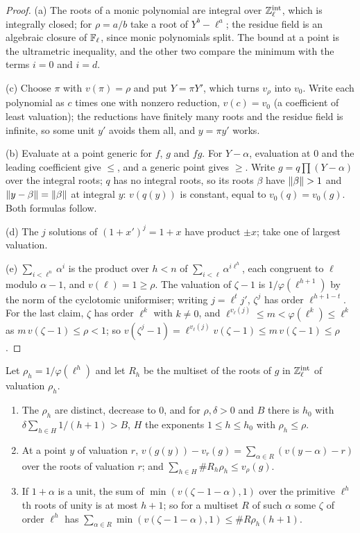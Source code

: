 \begin{proof}
(a) The roots of a monic polynomial are integral over $\mathbb{Z}_\ell^{\rm int}$, which is integrally closed; for $\rho=a/b$ take a root of $Y^b-\ell^a$; the residue field is an algebraic closure of $\mathbb{F}_\ell$, since monic polynomials split. The bound at a point is the ultrametric inequality, and the other two compare the minimum with the terms $i=0$ and $i=d$.

(c) Choose $\pi$ with $v(\pi)=\rho$ and put $Y=\pi Y'$, which turns $v_\rho$ into $v_0$. Write each polynomial as $c$ times one with nonzero reduction, $v(c)=v_0$ (a coefficient of least valuation); the reductions have finitely many roots and the residue field is infinite, so some unit $y'$ avoids them all, and $y=\pi y'$ works.

(b) Evaluate at a point generic for $f$, $g$ and $fg$. For $Y-\alpha$, evaluation at $0$ and the leading coefficient give $\le$, and a generic point gives $\ge$. Write $g=q\prod(Y-\alpha)$ over the integral roots; $q$ has no integral roots, so its roots $\beta$ have $\lVert \beta\rVert>1$ and $\lVert y-\beta\rVert=\lVert \beta\rVert$ at integral $y$: $v(q(y))$ is constant, equal to
$v_0(q)=v_0(g)$. Both formulas follow.

(d) The $j$ solutions of $(1+x')^j=1+x$ have product $\pm x$; take one of largest valuation.

(e) $\sum_{i<\ell^n}\alpha^i$ is the product over $h<n$ of $\sum_{i<\ell}\alpha^{i\ell^h}$, each congruent to $\ell$ modulo $\alpha-1$, and $v(\ell)=1\ge\rho$. The valuation of $\zeta-1$ is $1/\varphi(\ell^{h+1})$ by the norm of the cyclotomic uniformiser; writing $j=\ell^tj'$, $\zeta^j$ has order $\ell^{h+1-t}$. For the last claim, $\zeta$ has order $\ell^k$ with $k\ne0$, and
$\ell^{v_\ell(j)}\le m<\varphi(\ell^k)\le\ell^k$ as $m\,v(\zeta-1)\le\rho<1$; so $v(\zeta^j-1)=\ell^{v_\ell(j)}v(\zeta-1)\le m\,v(\zeta-1)\le\rho$.
\end{proof}

\begin{lemma}\label{lem:roots-one-variable}
Let $\rho_h=1/\varphi(\ell^h)$ and let $R_h$ be the multiset of the roots of $g$ in $\mathbb{Z}_\ell^{\rm int}$ of valuation $\rho_h$.
\begin{enumerate}[label=\textup{(\alph*)}]
\item The $\rho_h$ are distinct, decrease to $0$, and for $\rho,\delta>0$ and $B$ there is $h_0$ with $\delta\sum_{h\in H}1/(h+1)>B$, $H$ the exponents $1\le h\le h_0$ with $\rho_h\le\rho$.
\item At a point $y$ of valuation $r$, $v(g(y))-v_r(g)=\sum_{\alpha\in R}(v(y-\alpha)-r)$ over the roots of valuation $r$; and $\sum_{h\in H}\#R_h\rho_h\le v_\rho(g)$.
\item If $1+\alpha$ is a unit, the sum of $\min(v(\zeta-1-\alpha),1)$ over the primitive $\ell^h$th roots of unity is at most $h+1$; so for a multiset $R$ of such $\alpha$ some $\zeta$ of order $\ell^h$ has $\sum_{\alpha\in R}\min(v(\zeta-1-\alpha),1)\le\#R\rho_h(h+1)$.
\end{enumerate}
\end{lemma}

